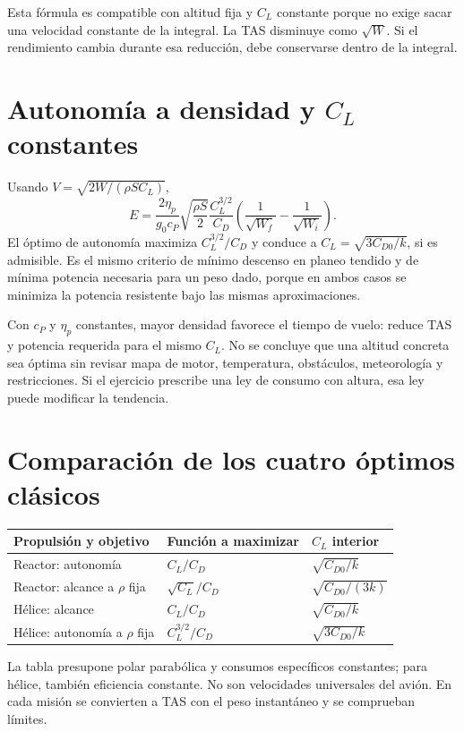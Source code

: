 Esta fórmula es compatible con altitud fija y $C_L$ constante porque no exige sacar una velocidad constante de la integral. La TAS disminuye como $\sqrt W$. Si el rendimiento cambia durante esa reducción, debe conservarse dentro de la integral.

\section{Autonomía a densidad y $C_L$ constantes}
Usando $V=\sqrt{2W/(\rho SC_L)}$,
\begin{equation}
E=\frac{2\eta_p}{g_0c_P}\sqrt{\frac{\rho S}{2}}
\frac{C_L^{3/2}}{C_D}
\left(\frac1{\sqrt{W_f}}-\frac1{\sqrt{W_i}}\right).
\label{eq:prop-endurance}
\end{equation}
El óptimo de autonomía maximiza $C_L^{3/2}/C_D$ y conduce a $C_L=\sqrt{3C_{D0}/k}$, si es admisible. Es el mismo criterio de mínimo descenso en planeo tendido y de mínima potencia necesaria para un peso dado, porque en ambos casos se minimiza la potencia resistente bajo las mismas aproximaciones.

Con $c_P$ y $\eta_p$ constantes, mayor densidad favorece el tiempo de vuelo: reduce TAS y potencia requerida para el mismo $C_L$. No se concluye que una altitud concreta sea óptima sin revisar mapa de motor, temperatura, obstáculos, meteorología y restricciones. Si el ejercicio prescribe una ley de consumo con altura, esa ley puede modificar la tendencia.

\section{Comparación de los cuatro óptimos clásicos}
\begin{center}\begin{tabular}{lll}\toprule
Propulsión y objetivo & Función a maximizar & $C_L$ interior\\\midrule
Reactor: autonomía & $C_L/C_D$ & $\sqrt{C_{D0}/k}$\\
Reactor: alcance a $\rho$ fija & $\sqrt{C_L}/C_D$ & $\sqrt{C_{D0}/(3k)}$\\
Hélice: alcance & $C_L/C_D$ & $\sqrt{C_{D0}/k}$\\
Hélice: autonomía a $\rho$ fija & $C_L^{3/2}/C_D$ & $\sqrt{3C_{D0}/k}$\\\bottomrule
\end{tabular}\end{center}
La tabla presupone polar parabólica y consumos específicos constantes; para hélice, también eficiencia constante. No son velocidades universales del avión. En cada misión se convierten a TAS con el peso instantáneo y se comprueban límites.

